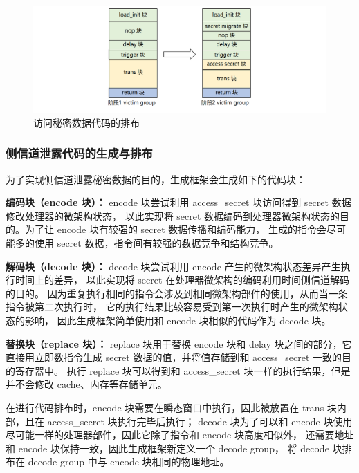 \begin{figure}[!h]
    \centering
    \includegraphics[width=\linewidth]{figure/paper/stage2-access-secret.png}
    \caption{访问秘密数据代码的排布}
    \label{paper:access-secret}
\end{figure}

\subsubsection{侧信道泄露代码的生成与排布}

为了实现侧信道泄露秘密数据的目的，生成框架会生成如下的代码块：\par

\textbf{编码块（encode 块）：}
encode 块尝试利用 access\_secret 块访问得到 secret 数据修改处理器的微架构状态，
以此实现将 secret 数据编码到处理器微架构状态的目的。为了让 encode 块有较强的 secret 数据传播和编码能力，
生成的指令会尽可能多的使用 secret 数据，指令间有较强的数据竞争和结构竞争。\par

\textbf{解码块（decode 块）：}
decode 块尝试利用 encode 产生的微架构状态差异产生执行时间上的差异，
以此实现将 secret 在处理器微架构的编码利用时间侧信道解码的目的。
因为重复执行相同的指令会涉及到相同微架构部件的使用，从而当一条指令被第二次执行时，
它的执行结果比较容易受到第一次执行时产生的微架构状态的影响，
因此生成框架简单使用和 encode 块相似的代码作为 decode 块。\par

\textbf{替换块（replace 块）：}
replace 块用于替换 encode 块和 delay 块之间的部分，它直接用立即数指令生成 secret 数据的值，并将值存储到和 access\_secret 一致的目的寄存器中。
执行 replace 块可以得到和 access\_secret 块一样的执行结果，但是并不会修改 cache、内存等存储单元。

在进行代码排布时，encode 块需要在瞬态窗口中执行，因此被放置在 trans 块内部，且在 access\_secret 块执行完毕后执行；
decode 块为了可以和 encode 块使用尽可能一样的处理器部件，因此它除了指令和 encode 块高度相似外，
还需要地址和 encode 块保持一致，因此生成框架新定义一个 decode group，
将 decode 块排布在 decode group 中与 encode 块相同的物理地址。\par

